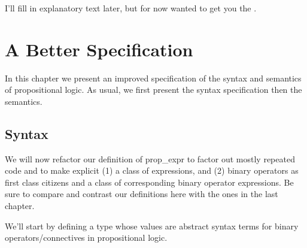 \documentclass[letterpaper,10pt,english]{sphinxmanual}
\begin{document}
\sphinxAtStartPar
I’ll fill in explanatory text later, but for now wanted
to get you the .


\section{A Better Specification}
\label{\detokenize{A_01_Propositional_Logic:a-better-specification}}
\sphinxAtStartPar
In this chapter we present an improved specification
of the syntax and semantics of propositional logic. As
usual, we first present the syntax specification then the
semantics.


\subsection{Syntax}
\label{\detokenize{A_01_Propositional_Logic:id5}}
\begin{sphinxVerbatim}[commandchars=\\\{\}]
   
    

    
    
    
\end{sphinxVerbatim}

\sphinxAtStartPar
We will now refactor our definition of
prop\_expr to factor out mostly repeated code
and to make explicit (1) a class of 
expressions, and (2) binary operators as first
class citizens and a class of corresponding
binary operator expressions. Be sure to compare
and contrast our definitions here with the ones in
the last chapter.

\sphinxAtStartPar
We’ll start by defining a  type
whose values are abstract syntax terms for binary
operators/connectives in propositional logic.
\end{document}
